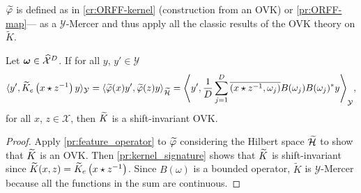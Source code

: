 $\tildePhi{\omega}$ is defined as in \cref{cr:ORFF-kernel} (construction from
an \acs{OVK}) or \cref{pr:ORFF-map}--- as a $\mathcal{Y}$-Mercer and thus apply
all the classic results of the \acl{OVK} theory on $\tilde{K}$.
\begin{proposition}
    \label{pr:orff_defines_kernel}
    Let $\boldsymbol{\mathbf{\omega}}\in\widehat{\mathcal{X}}^D$. If for all $y$,
    $y'\in\mathcal{Y}$
    \begin{dmath*}
        \inner{y', \tildeK{\omega}_e\left(x\groupop
        z^{-1}\right)y}_{\mathcal{Y}}
        =\inner{\tildePhi{\omega}(x)y',
        \tildePhi{\omega}(z)y}_{\tildeH{\omega}}
        =\inner*{y', \frac{1}{D}\sum_{j=1}^D \conj{\pairing{x\groupop
        z^{-1},\omega_j}}B(\omega_j)B(\omega_j)^*y}_{\mathcal{Y}},
    \end{dmath*}
    for all $x$, $z\in\mathcal{X}$, then $\widetilde{K}$ is a shift-invariant
    \acl{OVK}.
\end{proposition}
\begin{proof}
    Apply \cref{pr:feature_operator} to $\tildePhi{\omega}$ considering the
    Hilbert space $\widetilde{\mathcal{H}}$ to show that $\widetilde{K}$ is an
    \acs{OVK}. Then \cref{pr:kernel_signature} shows that $\widetilde{K}$ is
    shift-invariant since
    $\widetilde{K}(x,z)=\widetilde{K}_e\left(x\star z^{-1}\right)$.
    Since $B(\omega)$ is a bounded operator, $\widetilde{K}$ is
    $\mathcal{Y}$-Mercer because all the functions in the sum are continuous.
\end{proof}

